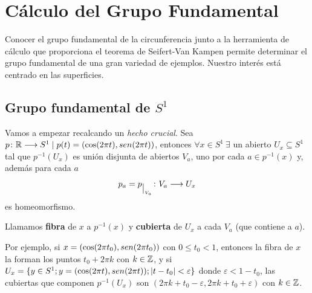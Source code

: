 \documentclass[GTS.tex]{subfiles}
\begin{document}
%
\renewcommand\chaptername{\Huge Tema}

\titleformat{\chapter}[display]
    {\normalfont\huge\bfseries}{\chaptertitlename\ \thechapter}{10pt}{\Huge}
\titlespacing*{\chapter}{0pt}{-1cm}{10pt}
%
%
%


\setcounter{chapter}{3}

\chapter{Cálculo del Grupo Fundamental}

Conocer el grupo fundamental de la circunferencia junto a la herramienta de cálculo que proporciona el teorema de Seifert-Van Kampen permite determinar el grupo fundamental de una gran variedad de ejemplos. Nuestro interés está centrado en las superficies.

\section{Grupo fundamental de $S^1$}

Vamos a empezar recalcando un {\em hecho crucial}. Sea $p\colon{\mathbb{R}}\longrightarrow{S^1}\mid p(t)=(\cos(2\pi t),sen (2\pi t))$, entonces $\forall x\in S^1\ \exists$ un abierto $U_x\subseteq S^1$ tal que $p^{-1}(U_x)$ es unión disjunta de abiertos $V_a$, uno por cada $a\in p^{-1}(x)$ y, además para cada $a$
\[
p_a=p_{\big|_{V_a}}\colon{V_a}\longrightarrow{U_x}
\]
es homeomorfismo.
\begin{defi}
Llamamos \textbf{fibra} de $x$ a $p^{-1}(x)$ y \textbf{cubierta} de $U_x$ a cada $V_a$ (que contiene a $a$).
\end{defi}

Por ejemplo, si $x=(\cos(2\pi t_0),sen (2\pi t_0))$ con $0\leq t_0 < 1$, entonces la fibra de $x$ la forman los puntos $t_0+2\pi k$ con $k\in \mathbb{Z}$, y si  $U_x =\{y\in S^1; y=(\cos(2\pi t),sen (2\pi t)); |t-t_0| < \varepsilon\}$ donde $\varepsilon<1-t_0$, las cubiertas que componen  $p^{-1}(U_x)$ son $(2\pi k+t_0-\varepsilon,2\pi k+t_0+\varepsilon)$ con $k\in\mathbb{Z}$.
\end{document}
